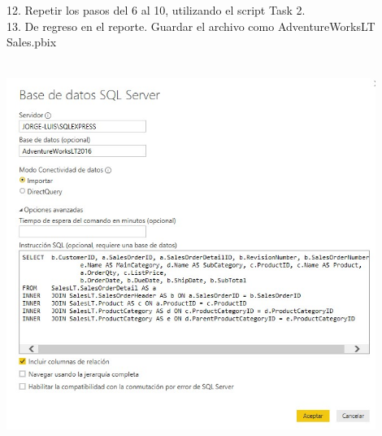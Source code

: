 \begin{flushleft}
\begin{itemize}
\begin{center}
	\end{center}
\textbf{ }\\
\textbf{ }\\
\textbf{ }\\
\textbf{ }\\
\textbf{ }\\
\textbf{ }\\
\textbf{ }\\
\textbf{ }\\
\textbf{ }\\
\textbf{ }\\
\textbf{ }\\
\textbf{ }\\
\textbf{ }\\
\textbf{ }\\
\textbf{ }\\
\textbf{ }\\
\textbf{ }\\
\textbf{ }\\
\textbf{ }\\
\textbf{ }\\
\textbf{ }\\
\textbf{ }\\
\textbf{ }\\
\textbf{ }\\
12. Repetir los pasos del 6 al 10, utilizando el script Task 2.\\
13. De regreso en el reporte. Guardar el archivo como AdventureWorksLT Sales.pbix\\
\textbf{ }\\
\begin{center}
	\includegraphics[width=12cm]{./Imagenes/image6} 

\end{center}
\end{itemize}
\end{flushleft}
